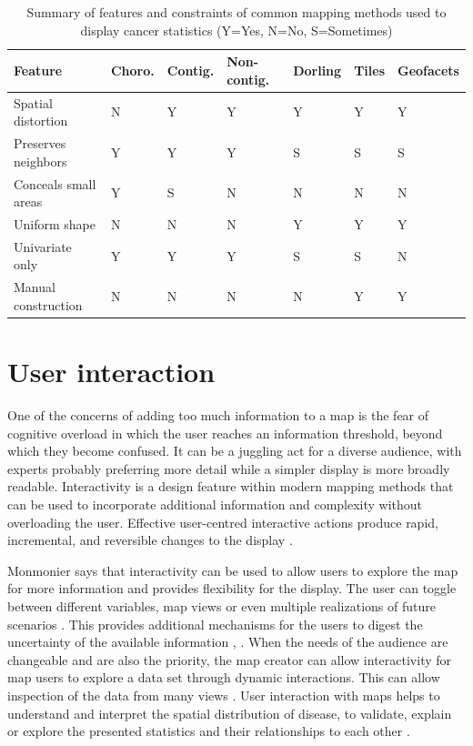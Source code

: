 \documentclass{monashthesis}
\begin{document}
\begin{table}

\caption{\label{tab:methods}Summary of features and constraints of common mapping methods used to display cancer statistics (Y=Yes, N=No, S=Sometimes) }
\centering
\begin{tabular}[t]{>{\raggedright\arraybackslash}p{7em}llllll}
\toprule
Feature & Choro. & Contig. & Non-contig. & Dorling & Tiles & Geofacets\\
\midrule
Spatial distortion & N & Y & Y & Y & Y & Y\\
Preserves neighbors & Y & Y & Y & S & S & S\\
Conceals small areas & Y & S & N & N & N & N\\
Uniform shape & N & N & N & Y & Y & Y\\
Univariate only & Y & Y & Y & S & S & N\\
Manual construction & N & N & N & N & Y & Y\\
\bottomrule
\end{tabular}
\end{table}

\hypertarget{interacting}{%
\section{User interaction}\label{interacting}}

One of the concerns of adding too much information to a map is the fear of cognitive overload \autocite{mcgranaghan1993cartographic} in which the user reaches an information threshold, beyond which they become confused. It can be a juggling act for a diverse audience, with experts probably preferring more detail \autocite{cliburn2002design} while a simpler display is more broadly readable. Interactivity is a design feature within modern mapping methods that can be used to incorporate additional information and complexity without overloading the user. Effective user-centred interactive actions produce rapid, incremental, and reversible changes to the display \autocite{DMIV}.

Monmonier \autocite{HTLWM} says that interactivity can be used to allow users to explore the map for more information and provides flexibility for the display. The user can toggle between different variables, map views or even multiple realizations of future scenarios \autocite{goodchild1994introduction}. This provides additional mechanisms for the users to digest the uncertainty of the available information \autocite{maceachren1992visualizing}, \autocite{van1994visualization}. When the needs of the audience are changeable and are also the priority, the map creator can allow interactivity for map users to explore a data set through dynamic interactions. This can allow inspection of the data from many views \autocite{DQBCM}. User interaction with maps helps to understand and interpret the spatial distribution of disease, to validate, explain or explore the presented statistics and their relationships to each other \autocite{TNTEA}.
\end{document}
